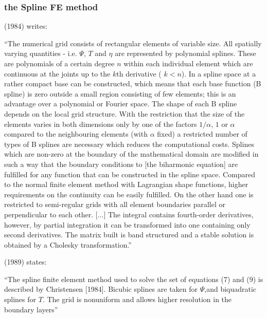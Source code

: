 \subsubsection{the Spline FE method} 

\textcite{chri84} (1984) writes:
\begin{displayquote}
{\color{darkgray}
``The numerical grid consists of rectangular elements of variable size. All spatially varying quantities - i.e. $\Psi$, $T$ and $\eta$ are represented by polynomial splines. These are polynomials of a certain degree $n$ within each individual element which are continuous at the joints up to the $k$th derivative ( $k<n$). 
In a spline space at a rather compact base can be constructed,
which means that each base function (B spline) is zero outside a small region consisting of few elements; this is an advantage over a polynomial or Fourier space. 
The shape of each B spline depends on the local grid structure. With the restriction that the size of the elements varies in both dimensions only by one of the factors 
$1/\alpha$, $1$ or $\alpha$ compared to the neighbouring elements (with $\alpha$ fixed) a restricted number of types of B splines are necessary which
reduces the computational costs. Splines which are non-zero at the boundary of the mathematical domain are modified in such a way that the boundary conditions to [the biharmonic equation] are fulfilled for any function that can be constructed in the spline space. Compared to the
normal finite element method with Lagrangian shape functions, higher requirements on the
continuity can be easily fulfilled. On the other hand one is restricted to semi-regular grids with all element boundaries parallel or perpendicular to each other.
[...]
The integral contains fourth-order derivatives, however, by partial integration it can be transformed into one containing only second derivatives. The matrix built is band
structured and a stable solution is obtained by a Cholesky transformation.''
}
\end{displayquote}

\noindent \textcite{chyu89} (1989) states: 
\begin{displayquote}
{\color{darkgray}
``The spline finite element method used to solve the set of
equations (7) and (9) is described by Christensen
[1984]. Bicubic splines are taken for $\Psi$,and biquadratic splines for $T$. The
grid is nonuniform and allows higher resolution in the boundary layers''
}
\end{displayquote}

